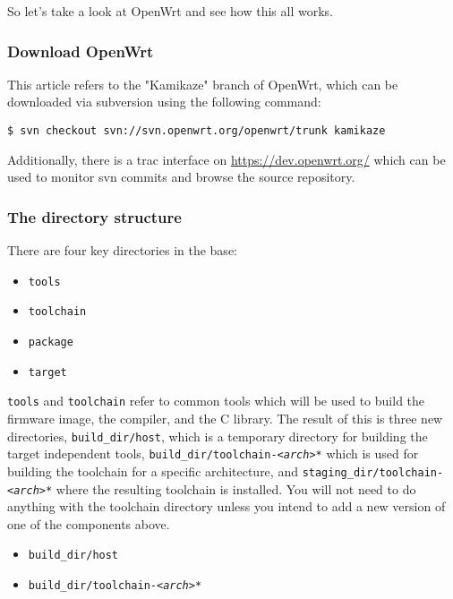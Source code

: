 So let's take a look at OpenWrt and see how this all works.


\subsubsection{Download OpenWrt}

This article refers to the "Kamikaze" branch of OpenWrt, which can be downloaded via
subversion using the following command:

\begin{Verbatim}
$ svn checkout svn://svn.openwrt.org/openwrt/trunk kamikaze
\end{Verbatim}

Additionally, there is a trac interface on \href{https://dev.openwrt.org/}{https://dev.openwrt.org/}
which can be used to monitor svn commits and browse the source repository.


\subsubsection{The directory structure}

There are four key directories in the base:

\begin{itemize}
    \item \texttt{tools}
    \item \texttt{toolchain}
    \item \texttt{package}
    \item \texttt{target}
\end{itemize}

\texttt{tools} and \texttt{toolchain} refer to common tools which will be
used to build the firmware image, the compiler, and the C library.
The result of this is three new directories, \texttt{build\_dir/host}, which is a temporary
directory for building the target independent tools, \texttt{build\_dir/toolchain-\textit{<arch>}*}
which is used for building the toolchain for a specific architecture, and
\texttt{staging\_dir/toolchain-\textit{<arch>}*} where the resulting toolchain is installed.
You will not need to do anything with the toolchain directory unless you intend to
add a new version of one of the components above.

\begin{itemize}
    \item \texttt{build\_dir/host}
    \item \texttt{build\_dir/toolchain-\textit{<arch>}*}
\end{itemize}

